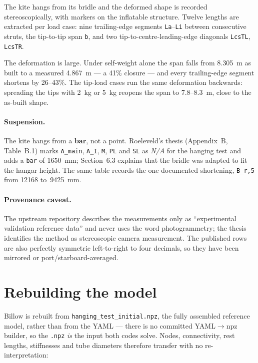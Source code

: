 \documentclass[11pt,a4paper]{article}
\begin{document}
The kite hangs from its bridle and the deformed shape is recorded
stereoscopically, with markers on the inflatable structure. Twelve lengths are
extracted per load case: nine trailing-edge segments \texttt{La}--\texttt{Li}
between consecutive struts, the tip-to-tip span \texttt{b}, and two
tip-to-centre-leading-edge diagonals \texttt{LcsTL}, \texttt{LcsTR}.

The deformation is large. Under self-weight alone the span falls from
\SI{8.305}{m} as built to a measured \SI{4.867}{m} --- a 41\% closure --- and
every trailing-edge segment shortens by 26--43\%. The tip-load cases run the
same deformation backwards: spreading the tips with \SI{2}{kg} or \SI{5}{kg}
reopens the span to \SI{7.8}{}--\SI{8.3}{m}, close to the as-built shape.

\paragraph{Suspension.} The kite hangs from a \textbf{bar}, not a point.
Roeleveld's thesis (Appendix~B, Table~B.1) marks \texttt{A\_main},
\texttt{A\_I}, \texttt{M}, \texttt{PL} and \texttt{SL} as \emph{N/A} for the
hanging test and adds a \texttt{bar} of \SI{1650}{mm}; Section~6.3 explains
that the bridle was adapted to fit the hangar height. The same table records
the one documented shortening, \texttt{B\_r,5} from \SI{12168}{}
to~\SI{9425}{mm}.

\paragraph{Provenance caveat.} The upstream repository describes the
measurements only as ``experimental validation reference data'' and never uses
the word photogrammetry; the thesis identifies the method as stereoscopic
camera measurement. The published rows are also perfectly symmetric
left-to-right to four decimals, so they have been mirrored or
port/starboard-averaged.

\section{Rebuilding the model}

Billow is rebuilt from \texttt{hanging\_test\_initial.npz}, the fully assembled
reference model, rather than from the YAML --- there is no committed
YAML$\rightarrow$npz builder, so the \texttt{.npz} \emph{is} the input both
codes solve. Nodes, connectivity, rest lengths, stiffnesses and tube diameters
therefore transfer with no re-interpretation:
\end{document}
